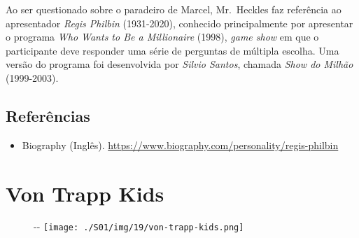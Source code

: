 Ao ser questionado sobre o paradeiro de Marcel, Mr.~Heckles faz
referência ao apresentador \emph{Regis Philbin} (1931-2020), conhecido
principalmente por apresentar o programa \emph{Who Wants to Be a
Millionaire} (1998), \emph{game show} em que o participante deve
responder uma série de perguntas de múltipla escolha. Uma versão do
programa foi desenvolvida por \emph{Silvio Santos}, chamada \emph{Show
do Milhão} (1999-2003).

\hypertarget{referuxeancias-3}{%
\subsection{Referências}\label{referuxeancias-3}}

\begin{itemize}
\tightlist
\item
  \sloppy Biography (Inglês). \url{https://www.biography.com/personality/regis-philbin}
\end{itemize}

\hypertarget{von-trapp-kids}{%
\section{Von Trapp Kids}\label{von-trapp-kids}}

\begin{figure}[!ht]
  \begin{adjustwidth}{-\oddsidemargin-1in}{-\rightmargin}
    \centering
    \texttt{[image: ./S01/img/19/von-trapp-kids.png]}
  \end{adjustwidth}
\end{figure}

